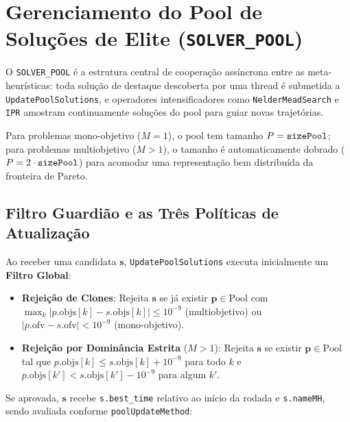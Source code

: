 \documentclass[11pt,a4paper]{article}
\begin{document}
\section{Gerenciamento do Pool de Soluções de Elite (\texttt{SOLVER\_POOL})}
\label{sec:pool}

O \texttt{SOLVER\_POOL} é a estrutura central de cooperação assíncrona entre as meta-heurísticas: toda solução de destaque descoberta por uma thread é submetida a \texttt{UpdatePoolSolutions}, e operadores intensificadores como \texttt{NelderMeadSearch} e \texttt{IPR} amostram continuamente soluções do pool para guiar novas trajetórias.

Para problemas mono-objetivo ($M=1$), o pool tem tamanho $P = \text{\texttt{sizePool}}$; para problemas multiobjetivo ($M > 1$), o tamanho é automaticamente dobrado ($P = 2 \cdot \text{\texttt{sizePool}}$) para acomodar uma representação bem distribuída da fronteira de Pareto.

\subsection{Filtro Guardião e as Três Políticas de Atualização}

Ao receber uma candidata $\mathbf{s}$, \texttt{UpdatePoolSolutions} executa inicialmente um \textbf{Filtro Global}:
\begin{itemize}[leftmargin=*]
  \item \textbf{Rejeição de Clones}: Rejeita $\mathbf{s}$ se já existir $\mathbf{p} \in \text{Pool}$ com $\max_k |p.\text{objs}[k] - s.\text{objs}[k]| \le 10^{-9}$ (multiobjetivo) ou $|p.\text{ofv} - s.\text{ofv}| < 10^{-9}$ (mono-objetivo).
  \item \textbf{Rejeição por Dominância Estrita} ($M > 1$): Rejeita $\mathbf{s}$ se existir $\mathbf{p} \in \text{Pool}$ tal que $p.\text{objs}[k] \le s.\text{objs}[k] + 10^{-9}$ para todo $k$ e $p.\text{objs}[k'] < s.\text{objs}[k'] - 10^{-9}$ para algum $k'$.
\end{itemize}

Se aprovada, $\mathbf{s}$ recebe \texttt{s.best\_time} relativo ao início da rodada e \texttt{s.nameMH}, sendo avaliada conforme \texttt{poolUpdateMethod}:
\end{document}

